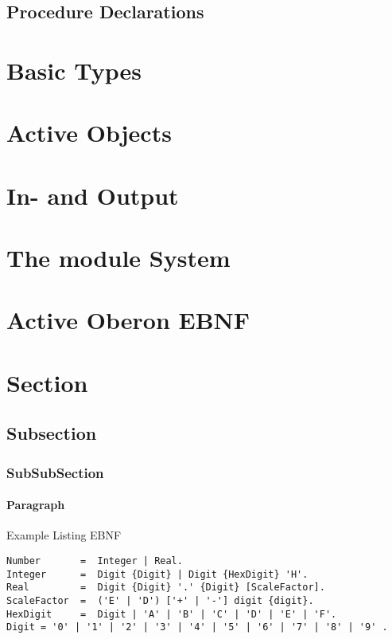 \documentclass[a4wide,11pt]{article}
\begin{document}
\subsection{Procedure Declarations}

\section{Basic Types}

\section{Active Objects}

\section{In- and Output}

\section{The module System}

\section{Active Oberon EBNF}



\section{Section}
\subsection{Subsection}
\subsubsection{SubSubSection}
\paragraph{Paragraph}

Example Listing EBNF
\begin{lstlisting}[language=ebnf]
Number       =  Integer | Real.
Integer      =  Digit {Digit} | Digit {HexDigit} 'H'.
Real         =  Digit {Digit} '.' {Digit} [ScaleFactor].
ScaleFactor  =  ('E' | 'D') ['+' | '-'] digit {digit}.
HexDigit     =  Digit | 'A' | 'B' | 'C' | 'D' | 'E' | 'F'.
Digit = '0' | '1' | '2' | '3' | '4' | '5' | '6' | '7' | '8' | '9' .
\end{lstlisting}
\end{document}
